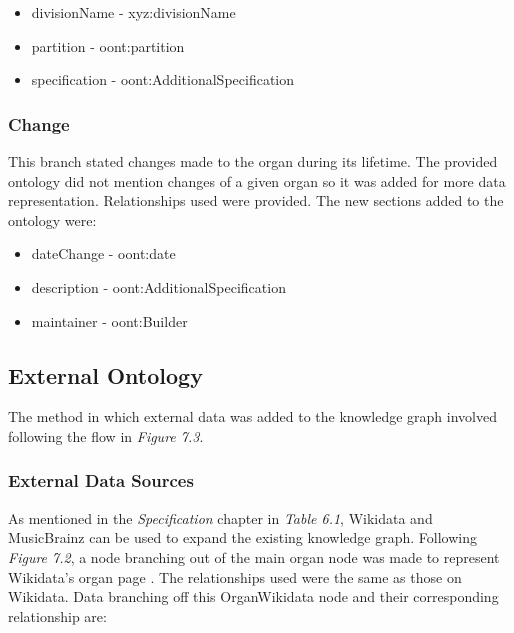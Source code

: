\vspace{-0.1cm}
\begin{itemize}
    \itemsep0em 
    \item divisionName - xyz:divisionName
    \vspace{-0.05cm}
    \item partition - oont:partition
    \vspace{-0.05cm}
    \item specification - oont:AdditionalSpecification
\end{itemize}

\subsubsection{Change}
\hspace*{0.5cm} This branch stated changes made to the organ during its lifetime. The provided ontology did not mention changes of a given organ so it was added for more data representation. Relationships used were provided. The new sections added to the ontology were:

\vspace{-0.15cm}
\begin{itemize}
    \itemsep0em 
    \item dateChange - oont:date 
    \vspace{-0.05cm}
    \item description - oont:AdditionalSpecification
    \vspace{-0.05cm}
    \item maintainer - oont:Builder
\end{itemize}
\vspace{-0.25cm}

\subsection{External Ontology}
\hspace*{0.5cm} The method in which external data was added to the knowledge graph involved following the flow in \textit{Figure 7.3}. 

\subsubsection{External Data Sources}
\hspace*{0.5cm} As mentioned in the \textit{Specification} chapter in \textit{Table 6.1}, Wikidata and MusicBrainz can be used to expand the existing knowledge graph. Following \textit{Figure 7.2}, a node branching out of the main organ node was made to represent Wikidata's organ page \cite{organwikidata}. The relationships used were the same as those on Wikidata. Data branching off this OrganWikidata node and their corresponding relationship are:


